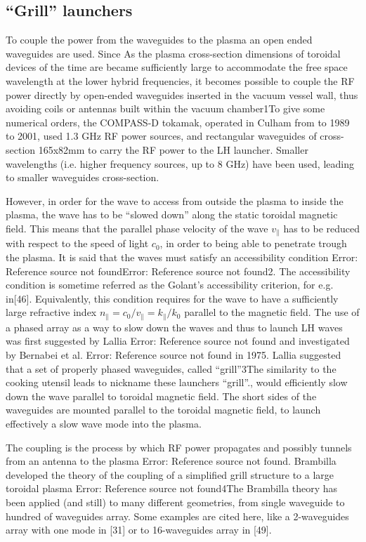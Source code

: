 \subsection{“Grill” launchers}
To couple the power from the waveguides to the plasma an open ended waveguides are used. Since As the plasma cross-section dimensions of toroidal devices of the time are became sufficiently large to accommodate the free space wavelength at the lower hybrid frequencies, it becomes possible to couple the RF power directly by open-ended waveguides inserted in the vacuum vessel wall, thus avoiding coils or antennas built within the vacuum chamber1To give some numerical orders, the COMPASS-D tokamak, operated in Culham from to 1989 to 2001, used 1.3 GHz RF power sources, and rectangular waveguides of cross-section 165x82mm to carry the RF power to the LH launcher. Smaller wavelengths (i.e. higher frequency sources, up to 8 GHz) have been used, leading to smaller waveguides cross-section.
 
However, in order for the wave to access from outside the plasma to inside the plasma, the wave has to be “slowed down” along the static toroidal magnetic field. This means that the parallel phase velocity of the wave $v_{\parallel}$ has to be reduced with respect to the speed of light $c_0$, in order to being able to penetrate trough the plasma. It is said that the waves must satisfy an accessibility condition Error: Reference source not foundError: Reference source not found2. The accessibility condition is sometime referred as the Golant's accessibility criterion, for e.g. in[46].
Equivalently, this condition requires for the wave to have a sufficiently large refractive index $n_{\parallel} = c_0/v_{\parallel} = k_{\parallel}/k_0$ parallel to the magnetic field. The use of a phased array as a way to slow down the waves and thus to launch LH waves was first suggested by Lallia Error: Reference source not found and investigated by Bernabei et al. Error: Reference source not found in 1975. Lallia suggested that a set of properly phased waveguides, called “grill”3The similarity to the cooking utensil leads to nickname these launchers “grill”., would efficiently slow down the wave parallel to toroidal magnetic field. The short sides of the waveguides are mounted parallel to the toroidal magnetic field, to launch effectively a slow wave mode into the plasma. 

The coupling is the process by which RF power propagates and possibly tunnels from an antenna to the plasma Error: Reference source not found. Brambilla developed the theory of the coupling of  a simplified grill structure to a large toroidal plasma Error: Reference source not found4The Brambilla theory has been applied (and still) to many different geometries, from single waveguide to hundred of waveguides array. Some examples are cited here, like a 2-waveguides array with one mode in [31] or to 16-waveguides array in [49].

